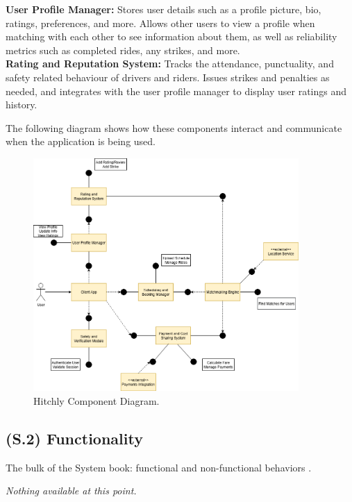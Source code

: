\documentclass[12pt,letterpaper]{article}
\begin{document}
\noindent \textbf{User Profile Manager:} Stores user details such as a profile picture, bio, ratings, preferences, and more. Allows other users to view a profile when matching with each other to see information about them, as well as reliability metrics such as completed rides, any strikes, and more. \\

\noindent \textbf{Rating and Reputation System:} Tracks the attendance, punctuality, and safety related behaviour of drivers and riders. Issues strikes and penalties as needed, and integrates with the user profile manager to display user ratings and history. \\
\vspace{1em}

\begin{samepage}
\noindent The following diagram shows how these components interact and communicate when the application is being used.
\begin{figure}[!h]
  \centering
  \includegraphics[width=0.9\textwidth]{component_diagram.png}
  \caption{Hitchly Component Diagram.}
\end{figure}
\end{samepage}
\clearpage

\subsection{(S.2) Functionality}
The bulk of the System book: functional and non-functional behaviors \cite{meyer2022}.

\textit{Nothing available at this point.}
\end{document}
